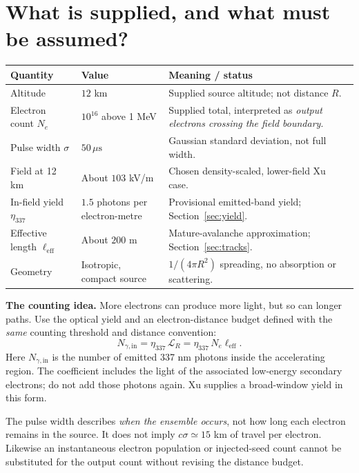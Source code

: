 \documentclass[11pt,a4paper]{article}
\newcommand{\xu}[1]{~\cite[#1]{Xu2015}}
\begin{document}
\section{What is supplied, and what must be assumed?}
\begin{tabularx}{\textwidth}{@{}P{35mm}P{38mm}Y@{}}
\toprule
\textbf{Quantity} & \textbf{Value} & \textbf{Meaning / status}\\
\midrule
Altitude & $12$ km & Supplied source altitude; not distance $R$.\\
Electron count $N_e$ & $10^{16}$ above 1 MeV & Supplied total, interpreted as \emph{output electrons crossing the field boundary}.\\
Pulse width $\sigma$ & $50\,\mu\mathrm{s}$ & Gaussian standard deviation, not full width.\\
Field at 12 km & About $103$ kV/m & Chosen density-scaled, lower-field Xu case.\\
In-field yield $\eta_{337}$ & $1.5$ photons per electron-metre & Provisional emitted-band yield; Section~\ref{sec:yield}.\\
Effective length $\ell_{\mathrm{eff}}$ & About $200$ m & Mature-avalanche approximation; Section~\ref{sec:tracks}.\\
Geometry & Isotropic, compact source & $1/(4\pi R^2)$ spreading, no absorption or scattering.\\
\bottomrule
\end{tabularx}

\textbf{The counting idea.} More electrons can produce more light, but so can longer paths. Use the optical yield and an electron-distance budget defined with the \emph{same} counting threshold and distance convention:
\begin{equation}
\boxed{N_{\gamma,\mathrm{in}}=\eta_{337}\,\mathcal L_R
=\eta_{337}\,N_e\ell_{\mathrm{eff}}.}\label{eq:budget}
\end{equation}
Here $N_{\gamma,\mathrm{in}}$ is the number of emitted 337 nm photons inside the accelerating region. The coefficient includes the light of the associated low-energy secondary electrons; do not add those photons again. Xu supplies a broad-window yield in this form.\xu{Sec.~4.1, p.~1366}

The pulse width describes \emph{when the ensemble occurs}, not how long each electron remains in the source. It does not imply $c\sigma\simeq15$ km of travel per electron. Likewise an instantaneous electron population or injected-seed count cannot be substituted for the output count without revising the distance budget.
\end{document}
